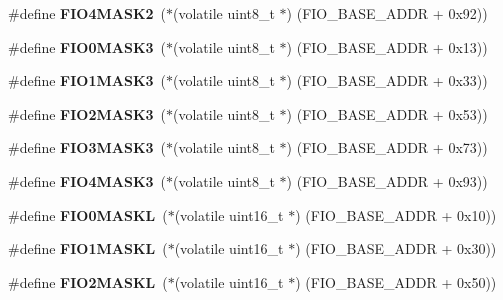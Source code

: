 \begin{DoxyCompactItemize}
\#define {\bfseries F\+I\+O4\+M\+A\+S\+K2}~($\ast$(volatile uint8\+\_\+t $\ast$) (F\+I\+O\+\_\+\+B\+A\+S\+E\+\_\+\+A\+D\+DR + 0x92))
\item 
\mbox{\label{group__lpc24xx__regs_ga72e1bcc80ce43e9541ee5086b196881c}} 
\#define {\bfseries F\+I\+O0\+M\+A\+S\+K3}~($\ast$(volatile uint8\+\_\+t $\ast$) (F\+I\+O\+\_\+\+B\+A\+S\+E\+\_\+\+A\+D\+DR + 0x13))
\item 
\mbox{\label{group__lpc24xx__regs_gaac1512ad6a6fe8ebbec3514a3df2283c}} 
\#define {\bfseries F\+I\+O1\+M\+A\+S\+K3}~($\ast$(volatile uint8\+\_\+t $\ast$) (F\+I\+O\+\_\+\+B\+A\+S\+E\+\_\+\+A\+D\+DR + 0x33))
\item 
\mbox{\label{group__lpc24xx__regs_ga0369667e6edce91f0fa7358386107d1a}} 
\#define {\bfseries F\+I\+O2\+M\+A\+S\+K3}~($\ast$(volatile uint8\+\_\+t $\ast$) (F\+I\+O\+\_\+\+B\+A\+S\+E\+\_\+\+A\+D\+DR + 0x53))
\item 
\mbox{\label{group__lpc24xx__regs_ga443186f6820d1df3087bb54379eb64de}} 
\#define {\bfseries F\+I\+O3\+M\+A\+S\+K3}~($\ast$(volatile uint8\+\_\+t $\ast$) (F\+I\+O\+\_\+\+B\+A\+S\+E\+\_\+\+A\+D\+DR + 0x73))
\item 
\mbox{\label{group__lpc24xx__regs_ga52cb51a91afbd14d9a3c493073b8e7a2}} 
\#define {\bfseries F\+I\+O4\+M\+A\+S\+K3}~($\ast$(volatile uint8\+\_\+t $\ast$) (F\+I\+O\+\_\+\+B\+A\+S\+E\+\_\+\+A\+D\+DR + 0x93))
\item 
\mbox{\label{group__lpc24xx__regs_ga2db09bd45262c4b0f82b228661fd520f}} 
\#define {\bfseries F\+I\+O0\+M\+A\+S\+KL}~($\ast$(volatile uint16\+\_\+t $\ast$) (F\+I\+O\+\_\+\+B\+A\+S\+E\+\_\+\+A\+D\+DR + 0x10))
\item 
\mbox{\label{group__lpc24xx__regs_gabb6985eaf64b5c6f725139de681014fb}} 
\#define {\bfseries F\+I\+O1\+M\+A\+S\+KL}~($\ast$(volatile uint16\+\_\+t $\ast$) (F\+I\+O\+\_\+\+B\+A\+S\+E\+\_\+\+A\+D\+DR + 0x30))
\item 
\mbox{\label{group__lpc24xx__regs_ga9f3d1f6a875fa031efc1f4bab47330c2}} 
\#define {\bfseries F\+I\+O2\+M\+A\+S\+KL}~($\ast$(volatile uint16\+\_\+t $\ast$) (F\+I\+O\+\_\+\+B\+A\+S\+E\+\_\+\+A\+D\+DR + 0x50))

\end{DoxyCompactItemize}
